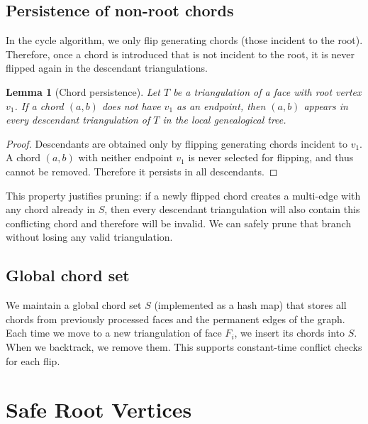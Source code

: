 \documentclass[12pt,a4paper]{report}
\newtheorem{lemma}[theorem]{Lemma}
\theoremstyle{definition}
\theoremstyle{remark}
\newcommand{\ChordSet}{S}
\begin{document}
\section{Persistence of non-root chords}

In the cycle algorithm, we only flip generating chords (those incident to the root).
Therefore, once a chord is introduced that is not incident to the root, it is never
flipped again in the descendant triangulations.

\begin{lemma}[Chord persistence]
Let $T$ be a triangulation of a face with root vertex $v_1$. If a chord $(a,b)$ does not
have $v_1$ as an endpoint, then $(a,b)$ appears in every descendant triangulation of $T$
in the local genealogical tree.
\end{lemma}

\begin{proof}
Descendants are obtained only by flipping generating chords incident to $v_1$. A chord
$(a,b)$ with neither endpoint $v_1$ is never selected for flipping, and thus cannot be
removed. Therefore it persists in all descendants.
\end{proof}

This property justifies pruning: if a newly flipped chord creates a multi-edge with any
chord already in $\ChordSet$, then every descendant triangulation will also contain this
conflicting chord and therefore will be invalid. We can safely prune that branch without
losing any valid triangulation.

\section{Global chord set}

We maintain a global chord set $\ChordSet$ (implemented as a hash map) that stores all
chords from previously processed faces and the permanent edges of the graph. Each time we
move to a new triangulation of face $F_i$, we insert its chords into $\ChordSet$. When we
backtrack, we remove them. This supports constant-time conflict checks for each flip.

\chapter{Safe Root Vertices}
\label{chap:saferoot}
\end{document}
